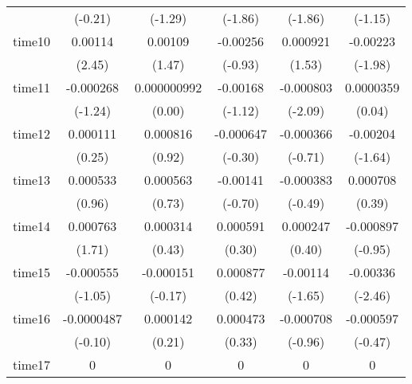 \begin{table}[htbp]
\begin{tabular}{l*{5}{c}}
            &     (-0.21)         &     (-1.29)         &     (-1.86)         &     (-1.86)         &     (-1.15)         \\
time10      &     0.00114\sym{*}  &     0.00109         &    -0.00256         &    0.000921         &    -0.00223\sym{*}  \\
            &      (2.45)         &      (1.47)         &     (-0.93)         &      (1.53)         &     (-1.98)         \\
time11      &   -0.000268         & 0.000000992         &    -0.00168         &   -0.000803\sym{*}  &   0.0000359         \\
            &     (-1.24)         &      (0.00)         &     (-1.12)         &     (-2.09)         &      (0.04)         \\
time12      &    0.000111         &    0.000816         &   -0.000647         &   -0.000366         &    -0.00204         \\
            &      (0.25)         &      (0.92)         &     (-0.30)         &     (-0.71)         &     (-1.64)         \\
time13      &    0.000533         &    0.000563         &    -0.00141         &   -0.000383         &    0.000708         \\
            &      (0.96)         &      (0.73)         &     (-0.70)         &     (-0.49)         &      (0.39)         \\
time14      &    0.000763         &    0.000314         &    0.000591         &    0.000247         &   -0.000897         \\
            &      (1.71)         &      (0.43)         &      (0.30)         &      (0.40)         &     (-0.95)         \\
time15      &   -0.000555         &   -0.000151         &    0.000877         &    -0.00114         &    -0.00336\sym{*}  \\
            &     (-1.05)         &     (-0.17)         &      (0.42)         &     (-1.65)         &     (-2.46)         \\
time16      &  -0.0000487         &    0.000142         &    0.000473         &   -0.000708         &   -0.000597         \\
            &     (-0.10)         &      (0.21)         &      (0.33)         &     (-0.96)         &     (-0.47)         \\
time17      &           0         &           0         &           0         &           0         &           0         \\

\end{tabular}
\end{table}
